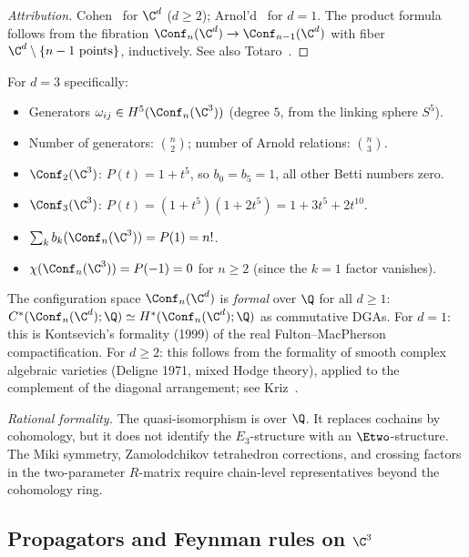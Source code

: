 \begin{proof}[Attribution]
Cohen~\cite{Cohen76} for $\C^d$ ($d \geq 2$); Arnol'd~\cite{Arnold70} for $d = 1$. The product formula follows from the fibration $\Conf_n(\C^d) \to \Conf_{n-1}(\C^d)$ with fiber $\C^d \setminus \{n-1 \text{ points}\}$, inductively. See also Totaro~\cite{Totaro96}.
\end{proof}

For $d = 3$ specifically:
\begin{itemize}
 \item Generators $\omega_{ij} \in H^5(\Conf_n(\C^3))$ (degree $5$, from the linking sphere $S^5$).
 \item Number of generators: $\binom{n}{2}$; number of Arnold relations: $\binom{n}{3}$.
 \item $\Conf_2(\C^3)$: $P(t) = 1 + t^5$, so $b_0 = b_5 = 1$, all other Betti numbers zero.
 \item $\Conf_3(\C^3)$: $P(t) = (1 + t^5)(1 + 2t^5) = 1 + 3t^5 + 2t^{10}$.
 \item $\sum_k b_k(\Conf_n(\C^3)) = P(1) = n!$.
 \item $\chi(\Conf_n(\C^3)) = P(-1) = 0$ for $n \geq 2$ (since the $k = 1$ factor vanishes).
\end{itemize}

\begin{remark}[Formality]
\label{rem:formality-conf-c3}
The configuration space $\Conf_n(\C^d)$ is \emph{formal} over $\Q$ for all $d \geq 1$: $C^*(\Conf_n(\C^d); \Q) \simeq H^*(\Conf_n(\C^d); \Q)$ as commutative DGAs. For $d = 1$: this is Kontsevich's formality (1999) of the real Fulton--MacPherson compactification. For $d \geq 2$: this follows from the formality of smooth complex algebraic varieties (Deligne 1971, mixed Hodge theory), applied to the complement of the diagonal arrangement; see Kriz~\cite{Kriz94}.

\emph{Rational formality.} The quasi-isomorphism is over \(\Q\). It
replaces cochains by cohomology, but it does not identify the
\(E_3\)-structure with an \(\Etwo\)-structure. The Miki symmetry,
Zamolodchikov tetrahedron corrections, and crossing factors in the
two-parameter \(R\)-matrix require chain-level representatives beyond
the cohomology ring.
\end{remark}


\subsection{Propagators and Feynman rules on \texorpdfstring{$\C^3$}{C-3}}
\label{subsec:propagators-c3}


